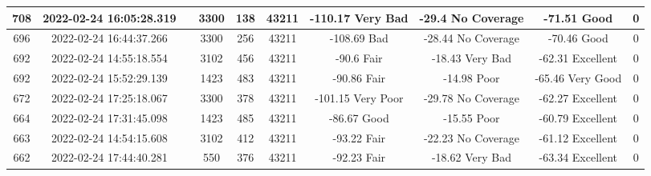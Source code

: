 \begin{longtable*}{|c|c|c|c|c|c|c|c|c|c|}
708&2022-02-24 16:05:28.319&&3300&138&43211& -110.17   Very Bad    & -29.4     No Coverage & -71.51    Good        & 0\\\hline
{}696&2022-02-24 16:44:37.266&&3300&256&43211& -108.69   Bad         & -28.44    No Coverage & -70.46    Good        & 0\\\hline
{}692&2022-02-24 14:55:18.554&&3102&456&43211& -90.6     Fair        & -18.43    Very Bad    & -62.31    Excellent   & 0\\\hline
{}692&2022-02-24 15:52:29.139&&1423&483&43211& -90.86    Fair        & -14.98    Poor        & -65.46    Very Good   & 0\\\hline
{}672&2022-02-24 17:25:18.067&&3300&378&43211& -101.15   Very Poor   & -29.78    No Coverage & -62.27    Excellent   & 0\\\hline
{}664&2022-02-24 17:31:45.098&&1423&485&43211& -86.67    Good        & -15.55    Poor        & -60.79    Excellent   & 0\\\hline
{}663&2022-02-24 14:54:15.608&&3102&412&43211& -93.22    Fair        & -22.23    No Coverage & -61.12    Excellent   & 0\\\hline
{}662&2022-02-24 17:44:40.281&&550&376&43211& -92.23    Fair        & -18.62    Very Bad    & -63.34    Excellent   & 0\\\hline

\end{longtable*}
